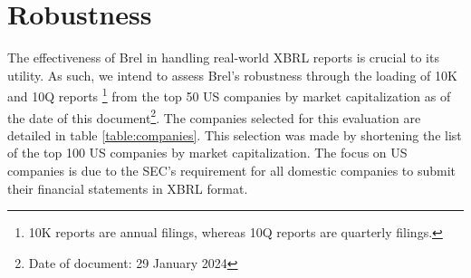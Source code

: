 \section{Robustness}
\label{sec:robustness}


The effectiveness of Brel in handling real-world XBRL reports is crucial to its utility.
As such, we intend to assess Brel's robustness through the loading of 10K and 10Q reports
\footnote{10K reports are annual filings, whereas 10Q reports are quarterly filings.}
from the top 50 US companies by market capitalization as of the date of this document\footnote{Date of document: 29 January 2024}.
The companies selected for this evaluation are detailed in table \ref{table:companies}.
This selection was made by shortening the list of the top 100 US companies by market capitalization\cite{largest_us_companies}.
The focus on US companies is due to the SEC's requirement for all domestic companies to submit their financial statements in XBRL format\cite{sec_ixbrl}.


